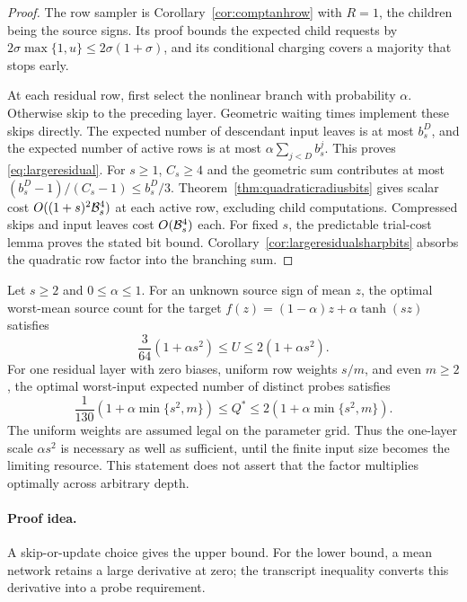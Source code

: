 \begin{proof}
The row sampler is Corollary~\ref{cor:comptanhrow} with $R=1$, the
children being the source signs. Its proof bounds the expected child
requests by $2\sigma\max\{1,u\}\le2\sigma(1+\sigma)$, and its
conditional charging covers a majority that stops early.

At each residual row, first select the nonlinear branch with
probability $\alpha$. Otherwise skip to the preceding layer.
Geometric waiting times implement these skips directly.
The expected number of descendant input leaves is at most $b_s^D$,
and the expected number of active rows is at most
$\alpha\sum_{j<D}b_s^j$. This proves \eqref{eq:largeresidual}.
For $s\ge1$, $C_s\ge4$ and the geometric sum contributes at most
$(b_s^D-1)/(C_s-1)\le b_s^D/3$.
Theorem~\ref{thm:quadraticradiusbits} gives scalar cost
$O((1+s)^2\mathcal B_s^4)$ at each active row, excluding child
computations. Compressed skips and input leaves cost
$O(\mathcal B_s^4)$ each. For fixed $s$, the predictable trial-cost
lemma proves the stated bit bound. Corollary~\ref{cor:largeresidualsharpbits}
absorbs the quadratic row factor into the branching sum.
\end{proof}



\begin{proposition}
\label{prop:residuallargeslower}
Let $s\ge2$ and $0\le\alpha\le1$.
For an unknown source sign of mean $z$, the optimal worst-mean
source count for the target
$f(z)=(1-\alpha)z+\alpha\tanh(sz)$ satisfies
\[
\frac3{64}(1+\alpha s^2)\le U\le2(1+\alpha s^2).
\]
For one residual layer with zero biases, uniform row weights
$s/m$, and even $m\ge2$, the optimal worst-input expected
number of distinct probes satisfies
\begin{equation}\label{eq:residuallargeslower}
\frac1{130}(1+\alpha\min\{s^2,m\})
\le Q^*\le2(1+\alpha\min\{s^2,m\}).
\end{equation}
The uniform weights are assumed legal on the parameter grid.
Thus the one-layer scale $\alpha s^2$ is necessary as well as
sufficient, until the finite input size becomes the limiting
resource. This statement does not assert that the factor
multiplies optimally across arbitrary depth.
\end{proposition}
\paragraph{Proof idea.}
A skip-or-update choice gives the upper bound. For the lower bound, a mean
network retains a large derivative at zero; the transcript inequality
converts this derivative into a probe requirement.

